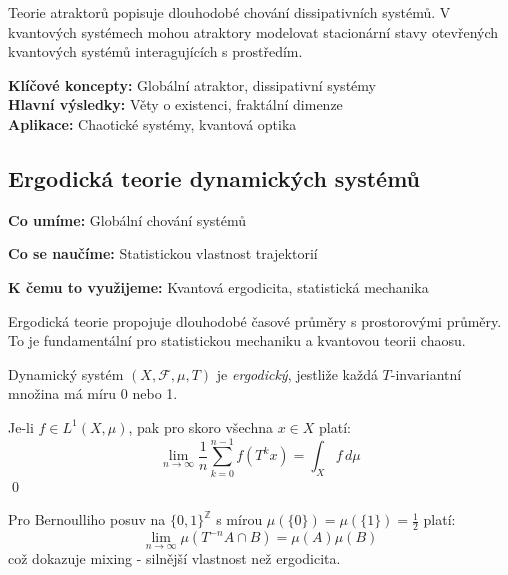 \begin{keyinsight}
Teorie atraktorů popisuje dlouhodobé chování dissipativních systémů. V kvantových systémech mohou atraktory modelovat stacionární stavy otevřených kvantových systémů interagujících s prostředím.
\end{keyinsight}

\begin{summary}
\textbf{Klíčové koncepty:} Globální atraktor, dissipativní systémy \\
\textbf{Hlavní výsledky:} Věty o existenci, fraktální dimenze \\
\textbf{Aplikace:} Chaotické systémy, kvantová optika
\end{summary}

\spc

\subsection{Ergodická teorie dynamických systémů}

\begin{scaffold}
\item[] \textbf{Co umíme:} Globální chování systémů
\item[] \textbf{Co se naučíme:} Statistickou vlastnost trajektorií  
\item[] \textbf{K čemu to využijeme:} Kvantová ergodicita, statistická mechanika
\end{scaffold}

\begin{motivation}
Ergodická teorie propojuje dlouhodobé časové průměry s prostorovými průměry. To je fundamentální pro statistickou mechaniku a kvantovou teorii chaosu.
\end{motivation}

\begin{definition}
Dynamický systém $(X, \mathcal{F}, \mu, T)$ je \emph{ergodický}, jestliže každá $T$-invariantní množina má míru 0 nebo 1.
\end{definition}

\begin{theorem}
Je-li $f \in L^1(X,\mu)$, pak pro skoro všechna $x \in X$ platí:
\[
\lim_{n \to \infty} \frac{1}{n} \sum_{k=0}^{n-1} f(T^k x) = \int_X f\, d\mu
\]
\qed
\end{theorem}

\begin{example}
Pro Bernoulliho posuv na $\{0,1\}^\mathbb{Z}$ s mírou $\mu(\{0\}) = \mu(\{1\}) = \frac{1}{2}$ platí:
\[
\lim_{n \to \infty} \mu(T^{-n}A \cap B) = \mu(A)\mu(B)
\]
což dokazuje mixing - silnější vlastnost než ergodicita.
\end{example}

